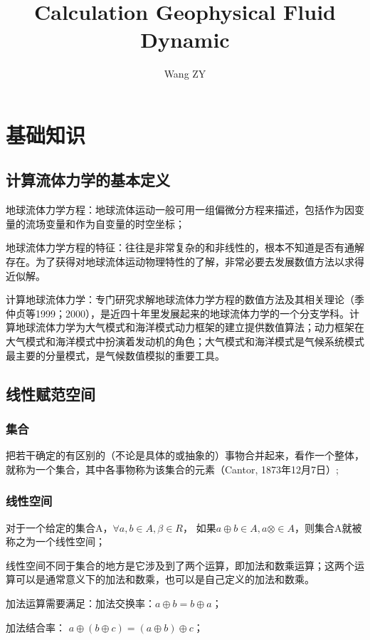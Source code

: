 \documentclass{article}
\title{Calculation Geophysical Fluid Dynamic}
\author{Wang ZY} %
\begin{document}
\maketitle
\tableofcontents
\newpage

\section{基础知识}
\subsection{计算流体力学的基本定义}
地球流体力学方程：地球流体运动一般可用一组偏微分方程来描述，包括作为因变量的流场变量和作为自变量的时空坐标；

地球流体力学方程的特征：往往是非常复杂的和非线性的，根本不知道是否有通解存在。为了获得对地球流体运动物理特性的了解，非常必要去发展数值方法以求得近似解。

计算地球流体力学：专门研究求解地球流体力学方程的数值方法及其相关理论（季仲贞等1999；2000），是近四十年里发展起来的地球流体力学的一个分支学科。计算地球流体力学为大气模式和海洋模式动力框架的建立提供数值算法；动力框架在大气模式和海洋模式中扮演着发动机的角色；大气模式和海洋模式是气候系统模式最主要的分量模式，是气候数值模拟的重要工具。

\subsection{线性赋范空间}
\subsubsection{集合}
把若干确定的有区别的（不论是具体的或抽象的）事物合并起来，看作一个整体，就称为一个集合，其中各事物称为该集合的元素（Cantor, 1873年12月7日）;

\subsubsection{线性空间}
对于一个给定的集合A，$\forall a,b\in A, \beta\in R$， 如果$a\oplus b\in A, a\otimes\in A$，则集合A就被称之为一个线性空间；

线性空间不同于集合的地方是它涉及到了两个运算，即加法和数乘运算；这两个运算可以是通常意义下的加法和数乘，也可以是自己定义的加法和数乘。

加法运算需要满足：加法交换率：$a\oplus b = b \oplus a$；

加法结合率： $a \oplus (b \oplus c) = (a \oplus b) \oplus c $；
\end{document}
